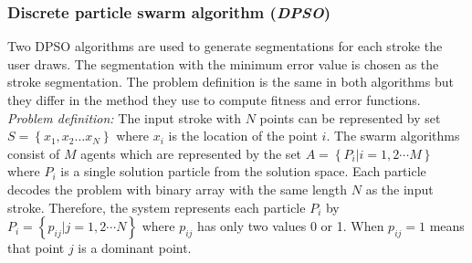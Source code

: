 \documentclass{article}%
\begin{document}
\subsubsection{Discrete particle swarm algorithm (\textit{DPSO})}
\label{subsubsec:Discreteparticleswarmalgorithm}
Two DPSO algorithms are used to generate segmentations for each stroke the user draws. The segmentation with the minimum error value is chosen as the stroke segmentation. The problem definition is the same in both algorithms but they differ in the method they use to compute fitness and error functions. \\
\textsl{Problem definition:} The input stroke with $N$ points can be represented by set $S = \left\{ {x_1 ,x_2  \ldots x_N }\right\}$ where $x_i$ is the location of the point $i$. The swarm algorithms consist of $M$ agents which are represented by the set  $A = \left\{ {P_i \left| {i = 1,2 \cdots M} \right.} \right\}$ where $P_i$ is a single solution particle from the solution space. Each particle decodes the problem with binary array with the same length $N$ as the input stroke.  
Therefore, the system represents each particle $P_i$ by $P_i = \left\{ {p_{ij} \left| {j = 1,2 \cdots N} \right.} \right\}$ where $p_{ij}$ has only two values 0 or 1. When $p_{ij}=1$ means that point $j$ is a dominant point. \\
\begin{figure}
	\centering
	\caption{}
	\label{fig:pso1}
\end{figure}
\end{document}
